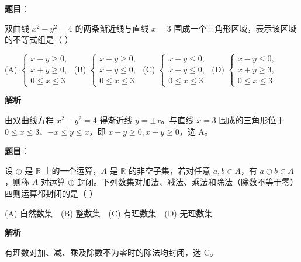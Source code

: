 \begin{answer}

\textbf{题目}：

双曲线 $x^2-y^2=4$ 的两条渐近线与直线 $x=3$ 围成一个三角形区域，表示该区域的不等式组是（ ）

(A) $\left\{\begin{array}{l}x-y\geq0,\\x+y\geq0,\\0\leq x\leq3\end{array}\right.$
(B) $\left\{\begin{array}{l}x-y\geq0,\\x+y\leq0,\\0\leq x\leq3\end{array}\right.$
(C) $\left\{\begin{array}{l}x-y\leq0,\\x+y\leq0,\\0\leq x\leq3\end{array}\right.$
(D) $\left\{\begin{array}{l}x-y\leq0,\\x+y\geq3,\\0\leq x\leq3\end{array}\right.$

\textbf{解析}

由双曲线方程 $x^2-y^2=4$ 得渐近线 $y=\pm x$。与直线 $x=3$ 围成的三角形位于 $0\le x\le3$、$-x\le y\le x$，即 $x-y\ge0,x+y\ge0$，选 A。


\end{answer}
\begin{answer}

\textbf{题目}：

设 $\oplus$ 是 $\mathbb R$ 上的一个运算，$A$ 是 $\mathbb R$ 的非空子集，若对任意 $a,b\in A$，有 $a\oplus b\in A$，则称 $A$ 对运算 $\oplus$ 封闭。下列数集对加法、减法、乘法和除法（除数不等于零）四则运算都封闭的是（ ）

(A) 自然数集　(B) 整数集　(C) 有理数集　(D) 无理数集

\textbf{解析}

有理数对加、减、乘及除数不为零时的除法均封闭，选 C。


\end{answer}
